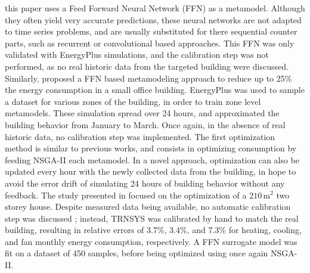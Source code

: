 \documentclass[12pt]{article}
\begin{document}
this paper uses a Feed Forward Neural Network (FFN) as a metamodel. Although they often yield very accurate predictions, these neural networks are not adapted to time series problems, and are usually substituted for there sequential counter parts, such as recurrent or convolutional based approaches. This FFN was only validated with EnergyPlus simulations, and the calibration step was not performed, as no real historic data from the targeted building were discussed. Similarly, \cite{Reynolds2018AZB} proposed a FFN based metamodeling approach to reduce up to 25\% the energy consumption in a small office building. EnergyPlus was used to sample a dataset for various zones of the building, in order to train zone level metamodels. These simulation spread over 24 hours, and approximated the building behavior from January to March. Once again, in the absence of real historic data, no calibration step was implemented. The first optimization method is similar to previous works, and consists in optimizing consumption by feeding NSGA-II each metamodel. In a novel approach, optimization can also be updated every hour with the newly collected data from the building, in hope to avoid the error drift of simulating 24 hours of building behavior without any feedback. The study presented in \cite{Magnier2010MultiobjectiveOO} focused on the optimization of a $210\,\mathrm{m}^2$ two storey house. Despite measured data being available, no automatic calibration step was discussed ; instead, TRNSYS was calibrated by hand to match the real building, resulting in relative errors of 3.7\%, 3.4\%, and 7.3\% for heating, cooling, and fan monthly energy consumption, respectively. A FFN surrogate model was fit on a dataset of 450 samples, before being optimized using once again NSGA-II. %
\end{document}

